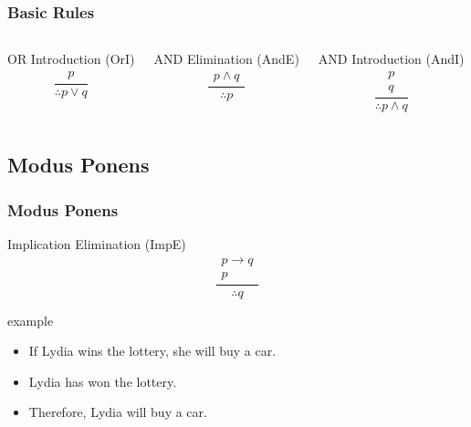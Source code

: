 \documentclass[dvipsnames]{beamer}
\begin{document}
\begin{frame}
  \frametitle{Basic Rules}

  \begin{columns}[t]
    \begin{block}{OR Introduction (OrI)}
      \[
      \frac
        {
          \begin{array}{c}
            p
          \end{array}
        }
        {
          \therefore p \vee q
        }
      \]
    \end{block}

    \pause
    \begin{block}{AND Elimination (AndE)}
    \[
    \frac
      {
        \begin{array}{c}
          p \wedge q
        \end{array}
      }
      {
        \therefore p
      }
    \]
    \end{block}

    \pause
    \begin{block}{AND Introduction (AndI)}
      \[
      \frac
        {
          \begin{array}{c}
            p\\
            q
          \end{array}
        }
        {
          \therefore p \wedge q
        }
      \]
    \end{block}
  \end{columns}
\end{frame}

\subsection{Modus Ponens}

\begin{frame}
  \frametitle{Modus Ponens}

  \begin{block}{Implication Elimination (ImpE)}
    \[
    \frac
      {
        \begin{array}{c}
          p \rightarrow q\\
          p
        \end{array}
      }
      {
        \therefore q
      }
    \]
  \end{block}

  \pause
  \begin{exampleblock}{example}
    \begin{itemize}
      \item If Lydia wins the lottery, she will buy a car.
      \item Lydia has won the lottery.

      \medskip
      \item Therefore, Lydia will buy a car.
    \end{itemize}
  \end{exampleblock}
\end{frame}
\end{document}
